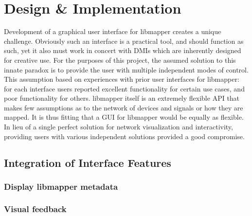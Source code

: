 \chapter{Design \& Implementation}

	Development of a graphical user interface for libmapper creates a unique challenge. Obviously such an interface is a practical tool, and should function as such, yet it also must work in concert with DMIs which are inherently designed for creative use. For the purposes of this project, the assumed solution to this innate paradox is to provide the user with multiple independent modes of control.  This assumption based on experiences with prior user interfaces for libmapper: for each interface users reported excellent functionality for certain use cases, and poor functionality for others. libmapper itself is an extremely flexible API that makes few assumptions as to the network of devices and signals or how they are mapped. It is thus fitting that a GUI for libmapper would be equally as flexible. In lieu of a single perfect solution for network visualization and interactivity, providing users with various independent solutions provided a good compromise.




\section{Integration of Interface Features} %
\label{sec:integration_of_interface_features}
	
	\subsection{Display libmapper metadata} %
	\label{sub:display_libmapper_metadata}
	

	\subsection{Visual feedback} %
	\label{sub:visual_feedback}



